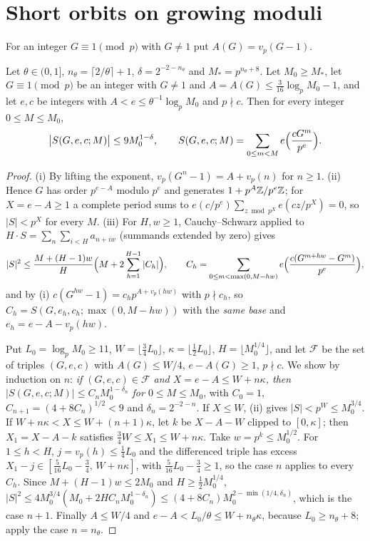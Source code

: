 \documentclass[11pt]{article}
\begin{document}
\section{Short orbits on growing moduli}\label{sec:orbits}

For an integer $G\equiv1\pmod p$ with $G\ne1$ put $A(G)=v_p(G-1)$.

\begin{lemma}\label{lem:uniformorbit}
Let $\theta\in(0,1]$, $n_\theta=\lceil2/\theta\rceil+1$, $\delta=2^{-2-n_\theta}$ and $M_*=p^{n_\theta+8}$. Let $M_0\ge M_*$, let
$G\equiv1\pmod p$ be an integer with $G\ne1$ and $A=A(G)\le\frac3{16}\log_pM_0-1$, and let $e,c$ be integers with
$A<e\le\theta^{-1}\log_pM_0$ and $p\nmid c$. Then for every integer $0\le M\le M_0$,
\[
\bigl|S(G,e,c;M)\bigr|\le9M_0^{1-\delta},\qquad S(G,e,c;M)=\sum_{0\le m<M}e\Bigl(\frac{cG^m}{p^e}\Bigr).
\]
\end{lemma}

\begin{proof}
(i) By lifting the exponent, $v_p(G^n-1)=A+v_p(n)$ for $n\ge1$. (ii) Hence $G$ has order $p^{e-A}$ modulo $p^e$ and
generates $1+p^A\mathbb Z/p^e\mathbb Z$; for $X=e-A\ge1$ a complete period sums to $e(c/p^e)\sum_{z\bmod p^X}e(cz/p^X)=0$, so $|S|<p^X$ for
every $M$. (iii) For $H,w\ge1$, Cauchy--Schwarz applied to $H\cdot S=\sum_n\sum_{i<H}a_{n+iw}$ (summands extended by zero) gives
\[
|S|^2\le\frac{M+(H-1)w}{H}\Bigl(M+2\sum_{h=1}^{H-1}|C_h|\Bigr),\qquad
C_h=\sum_{0\le m<\max(0,M-hw)}e\Bigl(\frac{c(G^{m+hw}-G^m)}{p^e}\Bigr),
\]
and by (i) $c(G^{hw}-1)=c_hp^{A+v_p(hw)}$ with $p\nmid c_h$, so $C_h=S(G,e_h,c_h;\max(0,M-hw))$ with the \emph{same base} and
$e_h=e-A-v_p(hw)$.

Put $L_0=\log_pM_0\ge11$, $W=\lfloor\frac34L_0\rfloor$, $\kappa=\lfloor\frac12L_0\rfloor$, $H=\lfloor M_0^{1/4}\rfloor$, and let
$\mathcal F$ be the set of triples $(G,e,c)$ with $A(G)\le W/4$, $e-A(G)\ge1$, $p\nmid c$. We show by induction on $n$:
\emph{if $(G,e,c)\in\mathcal F$ and $X=e-A\le W+n\kappa$, then $|S(G,e,c;M)|\le C_nM_0^{1-\delta_n}$ for $0\le M\le M_0$}, with
$C_0=1$, $C_{n+1}=(4+8C_n)^{1/2}<9$ and $\delta_n=2^{-2-n}$. If $X\le W$, (ii) gives $|S|<p^W\le M_0^{3/4}$. If
$W+n\kappa<X\le W+(n+1)\kappa$, let $k$ be $X-A-W$ clipped to $[0,\kappa]$; then $X_1=X-A-k$ satisfies
$\frac34W\le X_1\le W+n\kappa$. Take $w=p^k\le M_0^{1/2}$. For $1\le h<H$, $j=v_p(h)\le\frac14L_0$ and the differenced triple has
excess $X_1-j\in[\frac5{16}L_0-\frac34,\,W+n\kappa]$, with $\frac5{16}L_0-\frac34\ge1$, so the case $n$ applies to every $C_h$. Since
$M+(H-1)w\le2M_0$ and $H\ge\frac12M_0^{1/4}$,
$|S|^2\le4M_0^{3/4}(M_0+2HC_nM_0^{1-\delta_n})\le(4+8C_n)M_0^{2-\min(1/4,\delta_n)}$, which is the case $n+1$. Finally
$A\le W/4$ and $e-A<L_0/\theta\le W+n_\theta\kappa$, because $L_0\ge n_\theta+8$; apply the case $n=n_\theta$.
\end{proof}
\end{document}
